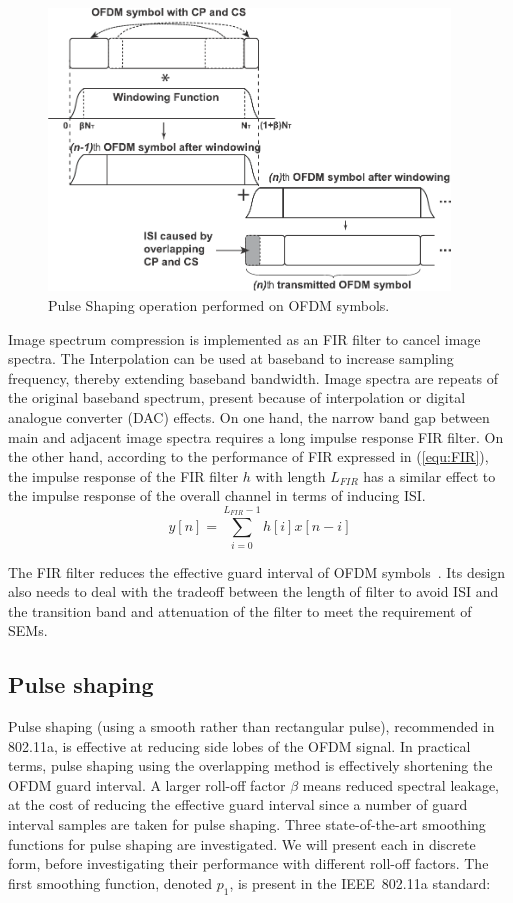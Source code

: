 \begin{figure}[t]
    \centerline{\includegraphics [width=0.9\columnwidth, height=7.5cm] {./Figures/w-ofdm.pdf} }
	\vspace{-2mm}
    \caption{Pulse Shaping operation performed on OFDM symbols.}
    \label{fig:PS}
\end{figure}

Image spectrum compression is implemented as an FIR filter to cancel image spectra.
The Interpolation can be used at baseband to increase sampling frequency, thereby extending baseband bandwidth.
Image spectra are repeats of the original baseband spectrum, present because of interpolation or digital analogue converter (DAC) effects.
On one hand, the narrow band gap between main and adjacent image spectra requires a long impulse response FIR filter.
On the other hand, according to the performance of FIR expressed in (\ref{equ:FIR}), the impulse response of the FIR filter $h$ with length $L_{FIR}$ has a similar effect to the impulse response of the overall channel in terms of inducing ISI.
\begin{equation}
\label{equ:FIR}
y[n] =  \sum_{i=0}^{L_{FIR}-1} h[i]x[n-i] 
\end{equation}

The FIR filter reduces the effective guard interval of OFDM symbols~\cite{farhang2008signal}.
Its design also needs to deal with the tradeoff between the length of filter to avoid ISI and the transition band and attenuation of the filter to meet the requirement of SEMs.

\subsection{Pulse shaping}
\label{subsec:Pulse}

Pulse shaping (using a smooth rather than rectangular pulse), recommended in 802.11a, is effective at reducing side lobes of the OFDM signal.
In practical terms, pulse shaping using the overlapping method is effectively shortening the OFDM guard interval.
A larger roll-off factor $\beta$ means reduced spectral leakage, at the cost of reducing the effective guard interval since a number of guard interval samples are taken for pulse shaping.
Three state-of-the-art smoothing functions for pulse shaping are investigated. We will present each in discrete form, before investigating their performance with different roll-off factors.
The first smoothing function, denoted $p_1$, is present in the IEEE~802.11a standard:

